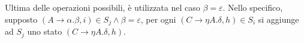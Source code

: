 \documentclass{subfiles}
\begin{document}
Ultima delle operazioni possibili, è utilizzata nel caso $\beta = \varepsilon$.
Nello specifico, supposto $(A \to \alpha . \beta, i) \in S_{j} \land \beta = \varepsilon$, per ogni $(C \to \eta A. \delta, h) \in S_{i}$
si aggiunge ad $S_{j}$ uno stato $(C \to \eta A. \delta, h)$.
\end{document}
